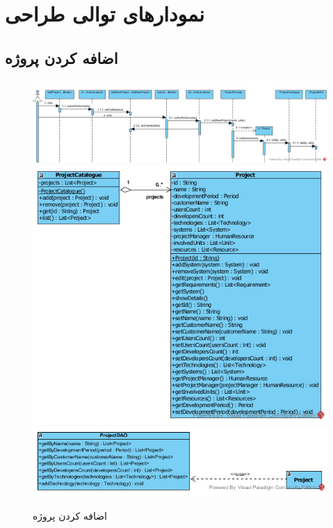 \chapter{نمودارهای توالی طراحی}

\newpage
\section{اضافه کردن پروژه}
\begin{figure}[H]
	\centering
	\includegraphics[scale=0.6]{img/sequence-design/AddProjectToOrganization}	
	\includegraphics[scale=0.7]{img/sequence-design/AddProjectToOrganizationC}
	\includegraphics[scale=0.7]{img/sequence-design/AddProjectToOrganizationD}
	\caption{اضافه کردن پروژه}
\end{figure}


